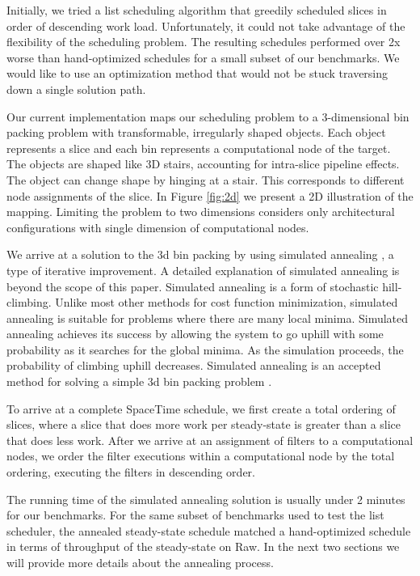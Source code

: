 Initially, we tried a list scheduling algorithm that greedily
scheduled slices in order of descending work load. Unfortunately, it
could not take advantage of the flexibility of the scheduling problem.
The resulting schedules performed over 2x worse than hand-optimized
schedules for a small subset of our benchmarks. We would like to use
an optimization method that would not be stuck traversing down a
single solution path.

Our current implementation maps our scheduling problem to a
3-dimensional bin packing problem with transformable, irregularly
shaped objects.  Each object represents a slice and each bin
represents a computational node of the target.  The objects are shaped
like 3D stairs, accounting for intra-slice pipeline effects. The
object can change shape by hinging at a stair.  This corresponds to
different node assignments of the slice.  In Figure
\ref{fig:2d} we present a 2D illustration of the mapping.  Limiting
the problem to two dimensions considers only architectural
configurations with single dimension of computational nodes.

We arrive at a solution to the 3d bin packing by using simulated
annealing \cite{simanneal}, a type of iterative improvement.  A
detailed explanation of simulated annealing is beyond the scope of
this paper.  Simulated annealing is a form of stochastic
hill-climbing. Unlike most other methods for cost function
minimization, simulated annealing is suitable for problems where there
are many local minima.  Simulated annealing achieves its success by
allowing the system to go uphill with some probability as it searches
for the global minima.  As the simulation proceeds, the probability of
climbing uphill decreases.  Simulated annealing is an accepted method
for solving a simple 3d bin packing problem \cite{binpacking}. 

To arrive at a complete SpaceTime schedule, we first create a total
ordering of slices, where a slice that does more work per steady-state
is greater than a slice that does less work.  After we arrive at an
assignment of filters to a computational nodes, we order the filter
executions within a computational node by the total ordering,
executing the filters in descending order.

The running time of the simulated annealing solution is usually under
2 minutes for our benchmarks.  For the same subset of benchmarks used
to test the list scheduler, the annealed steady-state schedule matched
a hand-optimized schedule in terms of throughput of the steady-state
on Raw.  In the next two sections we will provide more details about
the annealing process.

